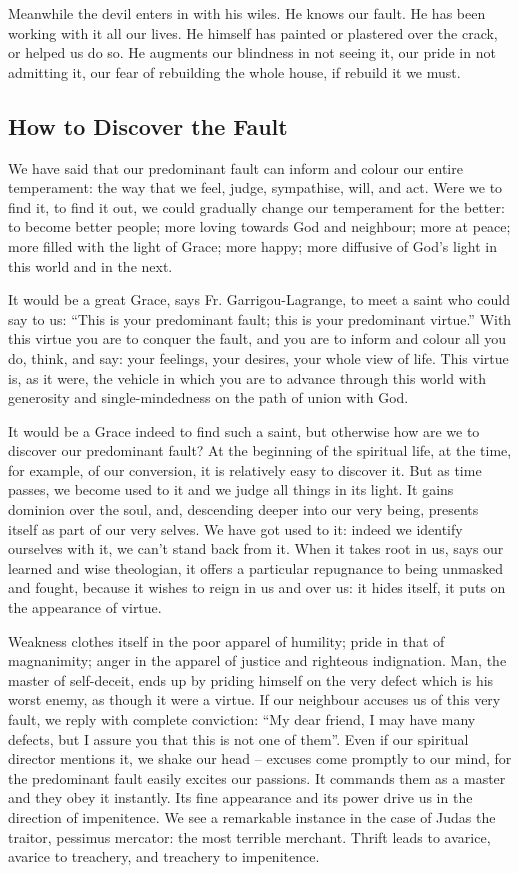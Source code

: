 Meanwhile the devil enters in with his wiles. He knows our fault. He has been working with it all our lives. He himself has painted or plastered over the crack, or helped us do so. He augments our blindness in not seeing it, our pride in not admitting it, our fear of rebuilding the whole house, if rebuild it we must.

\subsection*{How to Discover the Fault}

We have said that our predominant fault can inform and colour our entire temperament: the way that we feel, judge, sympathise, will, and act. Were we to find it, to find it out, we could gradually change our temperament for the better: to become better people; more loving towards God and neighbour; more at peace; more filled with the light of Grace; more happy; more diffusive of God's light in this world and in the next. 

It would be a great Grace, says Fr. Garrigou-Lagrange, to meet a saint who could say to us: ``This is your predominant fault; this is your predominant virtue.'' With this virtue you are to conquer the fault, and you are to inform and colour all you do, think, and say: your feelings, your desires, your whole view of life. This virtue is, as it were, the vehicle in which you are to advance through this world with generosity and single-mindedness on the path of union with God. 

It would be a Grace indeed to find such a saint, but otherwise how are we to discover our predominant fault? At the beginning of the spiritual life, at the time, for example, of our conversion, it is relatively easy to discover it. But as time passes, we become used to it and we judge all things in its light. It gains dominion over the soul, and, descending deeper into our very being, presents itself as part of our very selves. We have got used to it: indeed we identify ourselves with it, we can't stand back from it. When it takes root in us, says our learned and wise theologian, it offers a particular repugnance to being unmasked and fought, because it wishes to reign in us and over us: it hides itself, it puts on the appearance of virtue. 

Weakness clothes itself in the poor apparel of humility; pride in that of magnanimity; anger in the apparel of justice and righteous indignation. Man, the master of self-deceit, ends up by priding himself on the very defect which is his worst enemy, as though it were a virtue. If our neighbour accuses us of this very fault, we reply with complete conviction: ``My dear friend, I may have many defects, but I assure you that this is not one of them''. Even if our spiritual director mentions it, we shake our head – excuses come promptly to our mind, for the predominant fault easily excites our passions. It commands them as a master and they obey it instantly. Its fine appearance and its power drive us in the direction of impenitence. We see a remarkable instance in the case of Judas the traitor, pessimus mercator: the most terrible merchant. Thrift leads to avarice, avarice to treachery, and treachery to impenitence.

